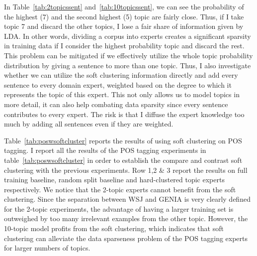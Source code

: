 In Table~\ref{tab:2topicssent} and~\ref{tab:10topicssent}, we can see the probability of the highest (7) and the second highest (5) topic are fairly close. Thus, if I take topic 7 and discard the other topics, I lose a fair share of information given by LDA. In other words, dividing a corpus into experts creates a significant sparsity in training data if I consider the highest probability topic and discard the rest.
This problem can be mitigated if we effectively utilize the whole topic probability distribution by giving a sentence to more than one topic. Thus, I also investigate whether we can utilize the soft clustering information directly and add every sentence to every domain expert, weighted based on the degree to which it represents the topic of this expert. This not only allows us to model topics in more detail, it can also help combating data sparsity since every sentence contributes to every expert. The risk is that I diffuse the expert knowledge too much by adding all sentences even if they are weighted. 

Table~\ref{tab:poswsoftcluster} reports the results of using soft clustering on POS tagging. I report all the results of the POS tagging experiments in table~\ref{tab:poswsoftcluster} in order to establish the compare and contrast soft clustering with the previous experiments. Row 1,2 \& 3 report the results on full training baseline, random split baseline and hard-clustered topic experts respectively.
We notice that the 2-topic experts cannot benefit from the soft clustering. Since the separation between WSJ and GENIA is very clearly defined for the 2-topic experiments,  the advantage of having a larger training set is outweighed by too many irrelevant examples from the other topic. However, the 10-topic model profits from the soft clustering, which indicates that soft clustering can alleviate the data sparseness problem of the POS tagging experts for larger numbers of topics. 

